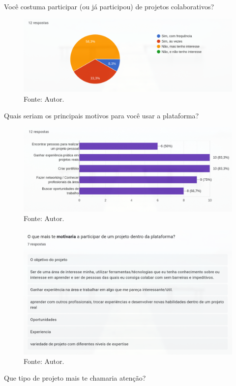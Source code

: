 {\Large
Você costuma participar (ou já participou) de projetos colaborativos?
}

\begin{figure}[H]
    \centering
    \includegraphics[width=0.8\linewidth]{images/graph_4.png}
    \caption{Fonte: Autor.}
    \label{fig:g4}
\end{figure}

{\Large
Quais seriam os principais motivos para você usar a plataforma? 
}

\begin{figure}[H]
    \centering
    \includegraphics[width=0.8\linewidth]{images/graph_5.png}
    \caption{Fonte: Autor.}
    \label{fig:g5}
\end{figure}

\begin{figure}[H]
    \centering
    \includegraphics[width=0.8\linewidth]{images/graph_6.png}
    \caption{Fonte: Autor.}
    \label{fig:g6}
\end{figure}

{\Large
Que tipo de projeto mais te chamaria atenção?
}

